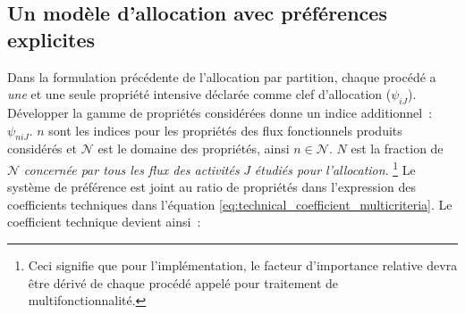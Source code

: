 \subsection{Un modèle d'allocation avec préférences explicites}
Dans la formulation précédente de l'allocation par partition, chaque procédé a \emph{une} et une seule propriété intensive déclarée comme clef d'allocation ($\psi_{iJ}$).
Développer la gamme de propriétés considérées donne un indice additionnel~: $\psi_{niJ}$.
$n$ sont les indices pour les propriétés des flux fonctionnels produits considérés et $\mathcal{N}$ est le domaine des propriétés, ainsi $n \in \mathcal{N}$.
$N$ est la fraction de $\mathcal{N}$ \emph{concernée par tous les flux des activités} $J$ \emph{étudiés pour l'allocation}.
\footnote{Ceci signifie que pour l'implémentation, le facteur d'importance relative devra être dérivé de chaque procédé appelé pour traitement de multifonctionnalité.}
Le système de préférence est joint au ratio de propriétés dans l'expression des coefficients techniques dans l'équation \eqref{eq:technical_coefficient_multicriteria}.
Le coefficient technique devient ainsi~:


%
%

